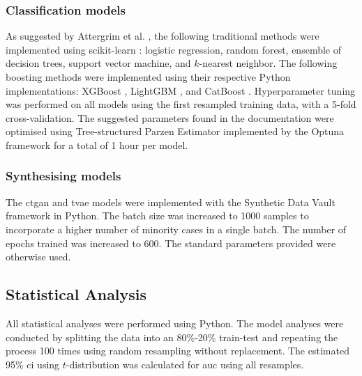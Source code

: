 \documentclass[12pt, a4paper]{article}
\begin{document}
\subsubsection*{Classification models}
As suggested by Attergrim et al. \cite{attergrim_predicting_2023}, the following traditional methods were implemented using scikit-learn \cite{pedregosa_scikit_2011}: logistic regression, random forest, ensemble of decision trees, support vector machine, and $k$-nearest neighbor. The following boosting methods were implemented using their respective Python implementations: XGBoost \cite{chen_xgboost_2016}, LightGBM \cite{ke_lightgbm_2017}, and CatBoost \cite{prokhorenkova_catboost_2018}. Hyperparameter tuning was performed on all models using the first resampled training data, with a 5-fold cross-validation. The suggested parameters found in the documentation were optimised using Tree-structured Parzen Estimator \cite{bergstra_algorithms_2011} implemented by the Optuna framework \cite{optuna_2019} for a total of 1 hour per model.

\subsubsection*{Synthesising models}
The \acrfull{ctgan} \cite{xu_modeling_2019} and \acrfull{tvae} \cite{ishfaq_tvae_2018} models were implemented with the Synthetic Data Vault framework \cite{patki_sdv_2016} in Python. The batch size was increased to 1000 samples to incorporate a higher number of minority cases in a single batch. The number of epochs trained was increased to 600. The standard parameters provided were otherwise used.

\subsection{Statistical Analysis}
All statistical analyses were performed using Python. The model analyses were conducted by splitting the data into an 80\%-20\% train-test and repeating the process 100 times using random resampling without replacement. The estimated 95\% \acrfull{ci} using $t$-distribution was calculated for \acrfull{auc} using all resamples.
\end{document}
